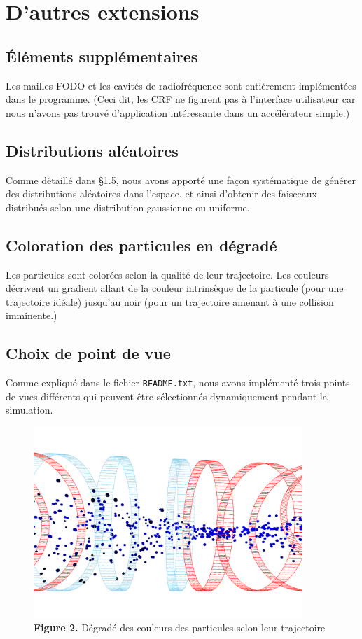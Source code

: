 \documentclass[12pt, letterpaper, twoside]{article}
\newcommand{\T}[1]{\texttt{#1}}
\begin{document}
\newpage
\section{D'autres extensions}
\subsection{Éléments supplémentaires}
\noindent Les mailles FODO et les cavités de radiofréquence sont entièrement implémentées dans le programme. (Ceci dit, les CRF ne figurent pas à l'interface utilisateur car nous n'avons pas trouvé d'application intéressante dans un accélérateur simple.)

\subsection{Distributions aléatoires}
\noindent Comme détaillé dans \S 1.5, nous avons apporté une façon systématique de générer des distributions aléatoires dans l'espace, et ainsi d'obtenir des faisceaux distribués selon une distribution gaussienne ou uniforme.

\subsection{Coloration des particules en dégradé}
\noindent Les particules sont colorées selon la qualité de leur trajectoire. Les couleurs décrivent un gradient allant de la couleur intrinsèque de la particule (pour une trajectoire idéale) jusqu'au noir (pour un trajectoire amenant à une collision imminente.)

\subsection{Choix de point de vue}
\noindent Comme expliqué dans le fichier \T{README.txt}, nous avons implémenté trois points de vues différents qui peuvent être sélectionnés dynamiquement pendant la simulation.

\begin{figure}[b!]
	\centering
	\includegraphics[width=4in]{images/colors.png}
	\caption{\textbf{Figure 2.} Dégradé des couleurs des particules selon leur trajectoire}
\end{figure}
\end{document}
